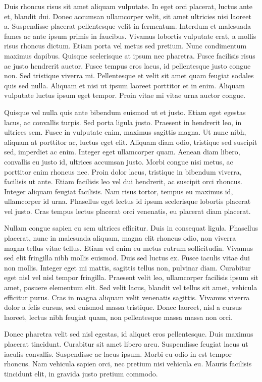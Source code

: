 Duis rhoncus risus sit amet aliquam vulputate. In eget orci placerat, luctus ante et, blandit dui. Donec accumsan ullamcorper velit, sit amet ultricies nisi laoreet a. Suspendisse placerat pellentesque velit in fermentum. Interdum et malesuada fames ac ante ipsum primis in faucibus. Vivamus lobortis vulputate erat, a mollis risus rhoncus dictum. Etiam porta vel metus sed pretium. Nunc condimentum maximus dapibus. Quisque scelerisque at ipsum nec pharetra. Fusce facilisis risus ac justo hendrerit auctor. Fusce tempus eros lacus, id pellentesque justo congue non. Sed tristique viverra mi. Pellentesque et velit sit amet quam feugiat sodales quis sed nulla. Aliquam et nisi ut ipsum laoreet porttitor et in enim. Aliquam vulputate luctus ipsum eget tempor. Proin vitae mi vitae urna auctor congue.

Quisque vel nulla quis ante bibendum euismod ut et justo. Etiam eget egestas lacus, ac convallis turpis. Sed porta ligula justo. Praesent in hendrerit leo, in ultrices sem. Fusce in vulputate enim, maximus sagittis magna. Ut nunc nibh, aliquam at porttitor ac, luctus eget elit. Aliquam diam odio, tristique sed suscipit sed, imperdiet ac enim. Integer eget ullamcorper quam. Aenean diam libero, convallis eu justo id, ultrices accumsan justo. Morbi congue nisi metus, ac porttitor enim rhoncus nec. Proin dolor lacus, tristique in bibendum viverra, facilisis ut ante. Etiam facilisis leo vel dui hendrerit, ac suscipit orci rhoncus. Integer aliquam feugiat facilisis. Nam risus tortor, tempus eu maximus id, ullamcorper id urna. Phasellus eget lectus id ipsum scelerisque lobortis placerat vel justo. Cras tempus lectus placerat orci venenatis, eu placerat diam placerat.

Nullam congue sapien eu sem ultrices efficitur. Duis in consequat ligula. Phasellus placerat, nunc in malesuada aliquam, magna elit rhoncus odio, non viverra magna tellus vitae tellus. Etiam vel enim eu metus rutrum sollicitudin. Vivamus sed elit fringilla nibh mollis euismod. Duis sed luctus ex. Fusce iaculis vitae dui non mollis. Integer eget mi mattis, sagittis tellus non, pulvinar diam. Curabitur eget nisl vel nisl tempor fringilla. Praesent velit leo, ullamcorper facilisis ipsum sit amet, posuere elementum elit. Sed velit lacus, blandit vel tellus sit amet, vehicula efficitur purus. Cras in magna aliquam velit venenatis sagittis. Vivamus viverra dolor a felis cursus, sed euismod massa tristique. Donec laoreet, nisl a cursus laoreet, lectus nibh feugiat quam, non pellentesque massa massa non orci.

Donec pharetra velit sed nisl egestas, id aliquet eros pellentesque. Duis maximus placerat tincidunt. Curabitur sit amet libero arcu. Suspendisse feugiat lacus ut iaculis convallis. Suspendisse ac lacus ipsum. Morbi eu odio in est tempor rhoncus. Nam vehicula sapien orci, nec pretium nisi vehicula eu. Mauris facilisis tincidunt elit, in gravida justo pretium commodo.
